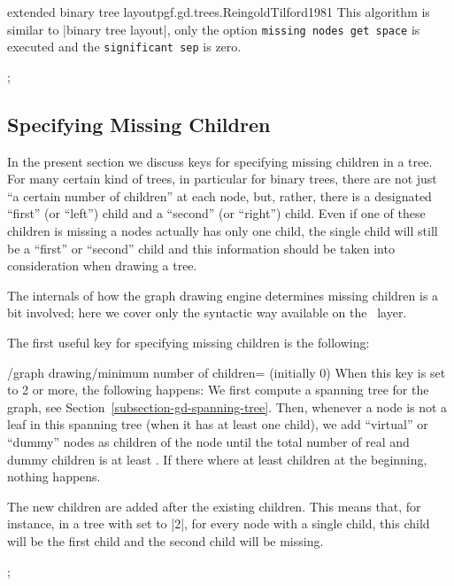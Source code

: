 \begin{gdalgorithm}{extended binary tree layout}{pgf.gd.trees.ReingoldTilford1981}
  This algorithm is similar to |binary tree layout|, only the option
  \texttt{missing nodes get space} is executed and the
  \texttt{significant sep} is zero.
\begin{codeexample}[]
\tikz [grow'=up, extended binary tree layout,
       sibling distance=7mm, level distance=7mm]
;
\end{codeexample}      
\end{gdalgorithm}


\subsection{Specifying Missing Children}

\label{section-gd-missing-children}

In the present section we discuss keys for specifying missing children
in a tree. For many certain kind of trees, in particular for binary
trees, there are not just ``a certain number of children'' at each
node, but, rather, there is a designated ``first'' (or ``left'') child
and a ``second'' (or ``right'') child. Even if one of these children
is missing a nodes actually has only one child, the single child will
still be a ``first'' or ``second'' child and this information should
be taken into consideration when drawing a tree.

The internals of how the graph drawing engine determines missing
children is a bit involved; here we cover only the syntactic way
available on the \tikzname\ layer.

The first useful key for specifying missing children is the following:
\begin{key}{/graph drawing/minimum number of children=
    (initially 0)}
  When this key is set to 2 or more, the following happens: We first
  compute a spanning tree for the graph, see
  Section~\ref{subsection-gd-spanning-tree}. Then, whenever a node is
  not a leaf in this spanning tree (when it has at least one child),
  we add ``virtual'' or ``dummy'' nodes as children of the node until
  the total number of real and dummy children is at least
  . If there where at least  children at the
  beginning, nothing happens.

  The new children are added after the existing children. This means
  that, for instance, in a tree with  set to |2|, for
  every node with a single child, this child will be the first child
  and the second child will be missing.
\begin{codeexample}[]
\tikz {};  
\end{codeexample}
\end{key}

